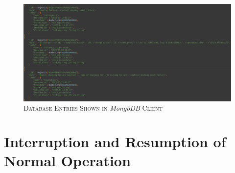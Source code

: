 \documentclass[english, master, utf8]{base/thesis_KBS}
\begin{document}
\begin{figure}[H]
    \centering
    \includegraphics[width=\textwidth]{pics/database_entries.png}
    \caption{\textsc{Database Entries Shown in} \textit{MongoDB} \textsc{Client}}
    \label{fig:database_entries}
\end{figure}

\section{Interruption and Resumption of Normal Operation}
\label{sec:plan_interruption_section}
\end{document}
